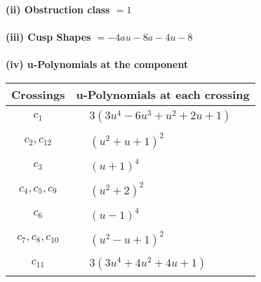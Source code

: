 \documentclass[1p]{elsarticle_modified}
\theoremstyle{definition}
\begin{document}
\flushleft \textbf{(ii) Obstruction class $= 1$}\\~\\
\flushleft \textbf{(iii) Cusp Shapes $= -4 a u-8 a-4 u-8$}\\~\\
\newpage\renewcommand{\arraystretch}{1}
\flushleft \textbf{(iv) u-Polynomials at the component}\newline \\
\begin{tabular}{m{50pt}|m{274pt}}
Crossings & \hspace{64pt}u-Polynomials at each crossing \\
\hline $$\begin{aligned}c_{1}\end{aligned}$$&$\begin{aligned}
&3(3 u^4-6 u^3+u^2+2 u+1)
\end{aligned}$\\
\hline $$\begin{aligned}c_{2},c_{12}\end{aligned}$$&$\begin{aligned}
&(u^2+u+1)^2
\end{aligned}$\\
\hline $$\begin{aligned}c_{3}\end{aligned}$$&$\begin{aligned}
&(u+1)^4
\end{aligned}$\\
\hline $$\begin{aligned}c_{4},c_{5},c_{9}\end{aligned}$$&$\begin{aligned}
&(u^2+2)^2
\end{aligned}$\\
\hline $$\begin{aligned}c_{6}\end{aligned}$$&$\begin{aligned}
&(u-1)^4
\end{aligned}$\\
\hline $$\begin{aligned}c_{7},c_{8},c_{10}\end{aligned}$$&$\begin{aligned}
&(u^2- u+1)^2
\end{aligned}$\\
\hline $$\begin{aligned}c_{11}\end{aligned}$$&$\begin{aligned}
&3(3 u^4+4 u^2+4 u+1)
\end{aligned}$\\
\hline
\end{tabular}\\~\\
\end{document}
